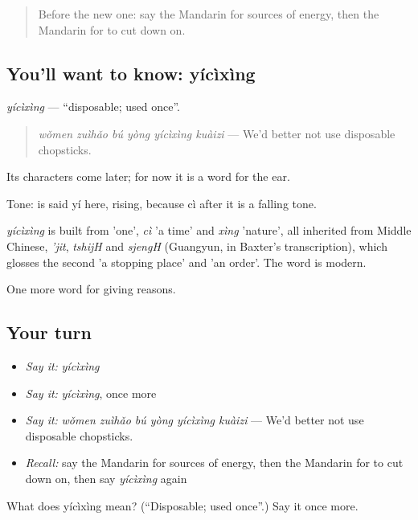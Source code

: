 \label{lesson:ZH-C383-yicixing}



\begin{quote}
Before the new one: say the Mandarin for sources of energy, then the Mandarin for to cut down on.
\end{quote}

\subsection*{You'll want to know: yícìxìng}
\emph{yícìxìng} — \textquotedblleft{}disposable; used once\textquotedblright{}.

\begin{quote}
\emph{wǒmen zuìhǎo bú yòng yícìxìng kuàizi} — We'd better not use disposable chopsticks.
\end{quote}

Its characters come later; for now it is a word for the ear.

Tone:  is said yí here, rising, because cì after it is a falling tone.

\begin{cousinweb}
\emph{yícìxìng} is built from  'one', \emph{cì} 'a time' and \emph{xìng} 'nature', all inherited from Middle Chinese, \emph{'jit}, \emph{tshijH} and \emph{sjengH} (Guangyun, in Baxter's transcription), which glosses the second 'a stopping place' and 'an order'. The word is modern.
\end{cousinweb}

\begin{grammarlens}[title={What you've built}]
One more word for giving reasons.
\end{grammarlens}

\subsection*{Your turn}
\begin{itemize}
\raggedright
  \item \emph{Say it:} \emph{yícìxìng}
  \item \emph{Say it:} \emph{yícìxìng}, once more
  \item \emph{Say it:} \emph{wǒmen zuìhǎo bú yòng yícìxìng kuàizi} — We'd better not use disposable chopsticks.
  \item \emph{Recall:} say the Mandarin for sources of energy, then the Mandarin for to cut down on, then say \emph{yícìxìng} again
\end{itemize}

\begin{tcolorbox}[breakable,colback=teal!4,colframe=teal!35!black,title={Before you move on}]
What does yícìxìng mean? (\textquotedblleft{}Disposable; used once\textquotedblright{}.) Say it once more.
\end{tcolorbox}
